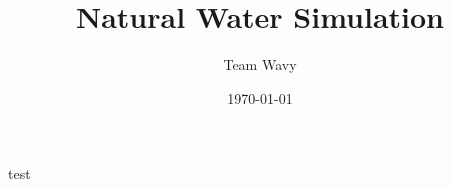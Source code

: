 \documentclass[handout,t]{beamer}
\title{Natural Water Simulation}
\author{Team Wavy}
\institute{School of Data and Computer Science(SYSU)}
\date{\today}
\begin{document}

\frame{\titlepage}
\section[]{}
\begin{frame}{test}
  \tableofcontents
\end{frame}





\end{document}
